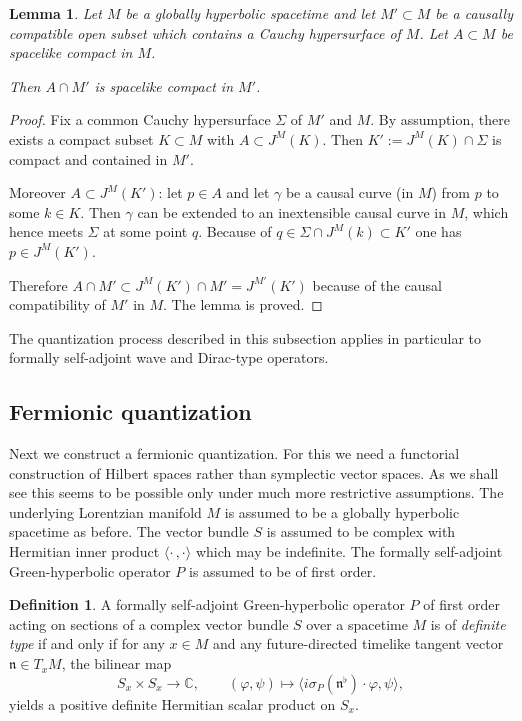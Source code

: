 \documentclass[a4paper,11pt]{amsart}
\newtheorem{lemma}[thm]{Lemma}
\theoremstyle{definition}
\newtheorem{definition}[thm]{Definition}
\begin{document}
\begin{lemma}\label{lem:spacecompact}
Let $M$ be a globally hyperbolic spacetime and let $M' \subset M$ be a causally compatible open subset which contains a Cauchy hypersurface of $M$.
Let $A\subset M$ be spacelike compact in $M$.

Then $A\cap M'$ is spacelike compact in $M'$.
\end{lemma}

\begin{proof}
Fix a common Cauchy hypersurface $\Sigma$ of $M'$ and $M$.
By assumption, there exists a compact subset $K\subset M$ with $A\subset
J^M(K)$.
Then $K':=J^M(K)\cap\Sigma$ is compact \cite[Cor.~A.5.4]{BGP} and contained in $M'$.

Moreover $A\subset J^M(K')$: let $p\in A$ and let $\gamma$ be a causal curve (in $M$) from $p$ to some $k\in K$.
Then $\gamma$ can be extended to an inextensible causal curve in $M$, which hence meets $\Sigma$ at some point $q$.
Because of $q\in\Sigma\cap J^M(k)\subset
K'$ one has $p\in J^M(K')$.

Therefore $A\cap M'\subset J^M(K')\cap M'=J^{M'}(K')$ because of the
causal compatibility of $M'$ in $M$.
The lemma is proved.
\end{proof}

The quantization process described in this subsection applies in particular to formally self-adjoint wave and Dirac-type operators.

\subsection{Fermionic quantization}

Next we construct a fermionic quantization.
For this we need a functorial construction of Hilbert spaces rather than symplectic vector spaces.
As we shall see this seems to be possible only under much more restrictive assumptions.
The underlying Lorentzian manifold $M$ is assumed to be a globally hyperbolic spacetime as before.
The vector bundle $S$ is assumed to be complex with Hermitian inner product ${\langle}\cdot\,,\cdot{\rangle}$ which may be indefinite.
The formally self-adjoint Green-hyperbolic operator $P$ is assumed to be of first order.

\begin{definition}\label{d:Diractypdef}
A formally self-adjoint Green-hyperbolic operator $P$ of first order acting on sections of a complex vector bundle $S$ over a spacetime $M$ is of \emph{definite type} if and only if for any $x\in M$ and any future-directed timelike tangent vector $\mathfrak{n}\in T_xM$, the bilinear map 
$$
S_x\times S_x \to {\mathbb{C}},
\quad\quad
({\varphi},\psi)\mapsto{\langle} i\sigma_P(\mathfrak{n}^\flat)\cdot{\varphi},\psi{\rangle} ,
$$
yields a positive definite Hermitian scalar product on $S_x$.
\end{definition}
\end{document}

